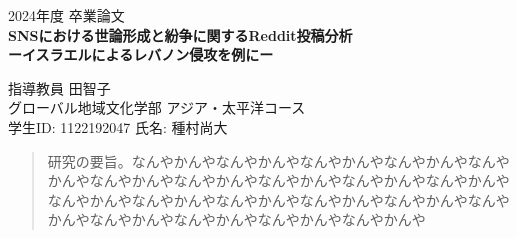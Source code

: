 \documentclass[11pt, a4j]{jreport}
\begin{document}
    \thispagestyle{empty}
    \begin{center}
        \vspace{20mm}
        {\Large\noindent 2024年度 卒業論文}\\
        \vspace{40mm}
        {\huge\noindent\textbf{SNSにおける世論形成と紛争に関するReddit投稿分析}}\\
        \medskip
        {\huge\noindent\textbf{ーイスラエルによるレバノン侵攻を例にー}}\\
        \vspace{\baselineskip}
        \vspace{40mm}

        {\Large\noindent \vspace{\baselineskip} 指導教員 田智子 \\ \vspace{\baselineskip} グローバル地域文化学部 アジア・太平洋コース \\ \vspace{\baselineskip} 学生ID: 1122192047 氏名: 種村尚大\\ }
        \vspace{40mm}
    \end{center}

    \thispagestyle{empty}
    \clearpage

    \renewcommand{\abstractname}{要旨}

    \begin{abstract}
        研究の要旨。なんやかんやなんやかんやなんやかんやなんやかんやなんやかんやなんやかんやなんやかんやなんやかんやなんやかんやなんやかんやなんやかんやなんやかんやなんやかんやなんやかんやなんやかんやなんやかんやなんやかんやなんやかんやなんやかんやなんやかんや
    \end{abstract}


    {\makeatletter
    \let\ps@jpl@in\ps@empty
    \makeatother
    \pagestyle{empty}
    \tableofcontents
    \clearpage}
    \pagestyle{plain}
    \lhead{\rightmark}
    \renewcommand{\chaptermark}[1]{\markboth{第\ \normalfont\thechapter\ 章~~#1}{}}
\end{document}

